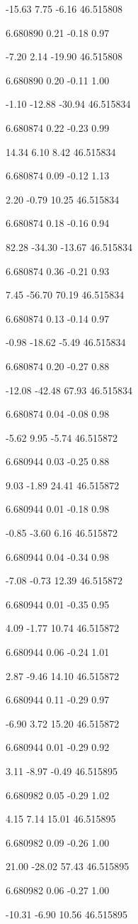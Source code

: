 -15.63
7.75
-6.16
46.515808

6.680890
0.21
-0.18
0.97

-7.20
2.14
-19.90
46.515808

6.680890
0.20
-0.11
1.00

-1.10
-12.88
-30.94
46.515834

6.680874
0.22
-0.23
0.99

14.34
6.10
8.42
46.515834

6.680874
0.09
-0.12
1.13

2.20
-0.79
10.25
46.515834

6.680874
0.18
-0.16
0.94

82.28
-34.30
-13.67
46.515834

6.680874
0.36
-0.21
0.93

7.45
-56.70
70.19
46.515834

6.680874
0.13
-0.14
0.97

-0.98
-18.62
-5.49
46.515834

6.680874
0.20
-0.27
0.88

-12.08
-42.48
67.93
46.515834

6.680874
0.04
-0.08
0.98

-5.62
9.95
-5.74
46.515872

6.680944
0.03
-0.25
0.88

9.03
-1.89
24.41
46.515872

6.680944
0.01
-0.18
0.98

-0.85
-3.60
6.16
46.515872

6.680944
0.04
-0.34
0.98

-7.08
-0.73
12.39
46.515872

6.680944
0.01
-0.35
0.95

4.09
-1.77
10.74
46.515872

6.680944
0.06
-0.24
1.01

2.87
-9.46
14.10
46.515872

6.680944
0.11
-0.29
0.97

-6.90
3.72
15.20
46.515872

6.680944
0.01
-0.29
0.92

3.11
-8.97
-0.49
46.515895

6.680982
0.05
-0.29
1.02

4.15
7.14
15.01
46.515895

6.680982
0.09
-0.26
1.00

21.00
-28.02
57.43
46.515895

6.680982
0.06
-0.27
1.00

-10.31
-6.90
10.56
46.515895


